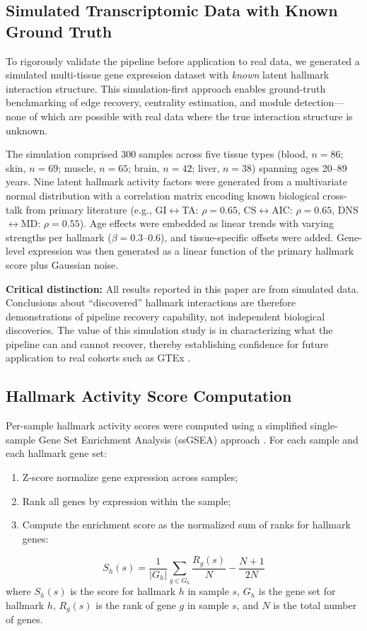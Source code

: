 \documentclass[11pt,a4paper]{article}
\begin{document}
\subsection{Simulated Transcriptomic Data with Known Ground Truth}
\label{sec:simulation}

To rigorously validate the pipeline before application to real data, we generated a simulated multi-tissue gene expression dataset with \textit{known} latent hallmark interaction structure. This simulation-first approach enables ground-truth benchmarking of edge recovery, centrality estimation, and module detection---none of which are possible with real data where the true interaction structure is unknown.

The simulation comprised 300 samples across five tissue types (blood, $n=86$; skin, $n=69$; muscle, $n=65$; brain, $n=42$; liver, $n=38$) spanning ages 20--89 years. Nine latent hallmark activity factors were generated from a multivariate normal distribution with a correlation matrix encoding known biological cross-talk from primary literature (e.g., GI$\leftrightarrow$TA: $\rho=0.65$, CS$\leftrightarrow$AIC: $\rho=0.65$, DNS$\leftrightarrow$MD: $\rho=0.55$). Age effects were embedded as linear trends with varying strengths per hallmark ($\beta = 0.3$--$0.6$), and tissue-specific offsets were added. Gene-level expression was then generated as a linear function of the primary hallmark score plus Gaussian noise.

\textbf{Critical distinction:} All results reported in this paper are from simulated data. Conclusions about ``discovered'' hallmark interactions are therefore demonstrations of pipeline recovery capability, not independent biological discoveries. The value of this simulation study is in characterizing what the pipeline can and cannot recover, thereby establishing confidence for future application to real cohorts such as GTEx \citep{lopez2023hallmarks}.

\subsection{Hallmark Activity Score Computation}

Per-sample hallmark activity scores were computed using a simplified single-sample Gene Set Enrichment Analysis (ssGSEA) approach \citep{barbie2009systematic}. For each sample and each hallmark gene set:
\begin{enumerate}[noitemsep]
    \item Z-score normalize gene expression across samples;
    \item Rank all genes by expression within the sample;
    \item Compute the enrichment score as the normalized sum of ranks for hallmark genes:
\end{enumerate}
\begin{equation}
    S_h(s) = \frac{1}{|G_h|} \sum_{g \in G_h} \frac{R_g(s)}{N} - \frac{N+1}{2N}
\end{equation}
where $S_h(s)$ is the score for hallmark $h$ in sample $s$, $G_h$ is the gene set for hallmark $h$, $R_g(s)$ is the rank of gene $g$ in sample $s$, and $N$ is the total number of genes.
\end{document}
